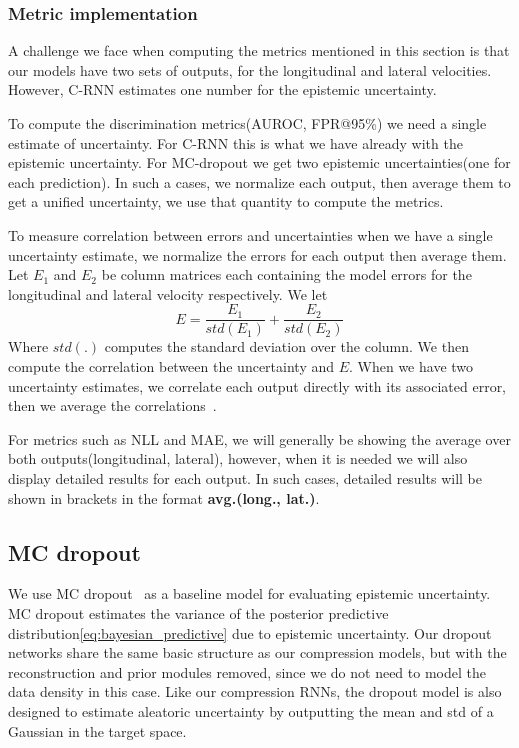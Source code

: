 \documentclass[../main.tex]{subfiles}
\begin{document}
\subsubsection{Metric implementation}

A challenge we face when computing the metrics mentioned in this section is that our models have two sets of outputs, for the longitudinal and lateral velocities. However, C-RNN estimates one number for the epistemic uncertainty.

To compute the discrimination metrics(AUROC, FPR@95\%) we need a single estimate of uncertainty. For C-RNN this is what we have already with the epistemic uncertainty. For MC-dropout we get two epistemic uncertainties(one for each prediction). In such a cases, we normalize each output, then average them to get a unified uncertainty, we use that quantity to compute the metrics.

To measure correlation between errors and uncertainties when we have a single uncertainty estimate, we normalize the errors for each output then average them. Let $E_1$ and $E_2$ be column matrices each containing the model errors for the longitudinal and lateral velocity respectively. We let
$$
    E = \frac{E_1}{std(E_1)} + \frac{E_2}{std(E_2)}
$$
Where $std(.)$ computes the standard deviation over the column. We then compute the correlation between the uncertainty and $E$. When we have two uncertainty estimates, we correlate each output directly with its associated error, then we average the correlations~\citep{alexander1990note}.

For metrics such as NLL and MAE, we will generally be showing the average over both outputs(longitudinal, lateral), however, when it is needed we will also display detailed results for each output. In such cases, detailed results will be shown in brackets in the format \textbf{avg.(long., lat.)}. 

\subsection{MC dropout}

We use MC dropout~\citep{gal2016dropout} as a baseline model for evaluating epistemic uncertainty. MC dropout estimates the variance of the posterior predictive distribution\cref{eq:bayesian_predictive} due to epistemic uncertainty. Our dropout networks share the same basic structure as our compression models, but with the reconstruction and prior modules removed, since we do not need to model the data density in this case. Like our compression RNNs, the dropout model is also designed to estimate aleatoric uncertainty by outputting the mean and std of a Gaussian in the target space.
\end{document}
